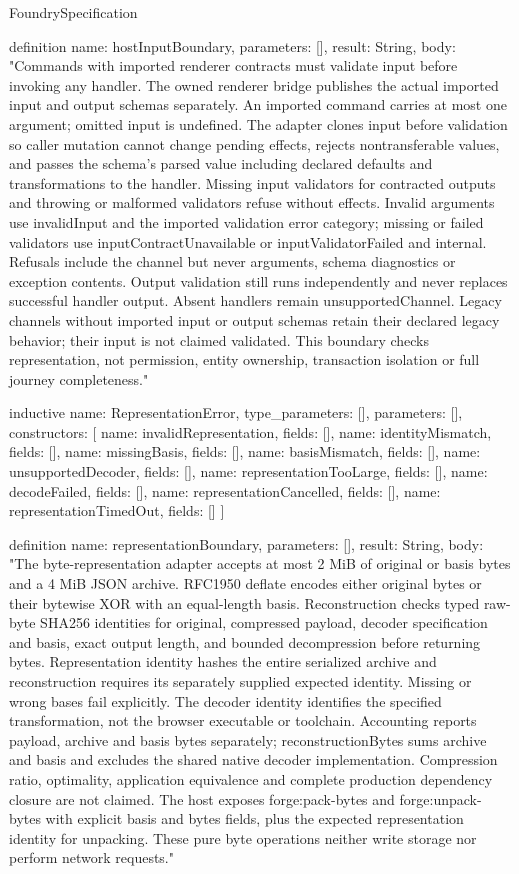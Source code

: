 \begin{lexlean}{FoundrySpecification}
\begin{semanticmodule}
definition{
  name: hostInputBoundary,
  parameters: [],
  result: String,
  body: "Commands with imported renderer contracts must validate input before invoking any handler. The owned renderer bridge publishes the actual imported input and output schemas separately. An imported command carries at most one argument; omitted input is undefined. The adapter clones input before validation so caller mutation cannot change pending effects, rejects nontransferable values, and passes the schema's parsed value including declared defaults and transformations to the handler. Missing input validators for contracted outputs and throwing or malformed validators refuse without effects. Invalid arguments use invalidInput and the imported validation error category; missing or failed validators use inputContractUnavailable or inputValidatorFailed and internal. Refusals include the channel but never arguments, schema diagnostics or exception contents. Output validation still runs independently and never replaces successful handler output. Absent handlers remain unsupportedChannel. Legacy channels without imported input or output schemas retain their declared legacy behavior; their input is not claimed validated. This boundary checks representation, not permission, entity ownership, transaction isolation or full journey completeness."
}

inductive{
  name: RepresentationError,
  type_parameters: [],
  parameters: [],
  constructors: [
    {name: invalidRepresentation, fields: []},
    {name: identityMismatch, fields: []},
    {name: missingBasis, fields: []},
    {name: basisMismatch, fields: []},
    {name: unsupportedDecoder, fields: []},
    {name: representationTooLarge, fields: []},
    {name: decodeFailed, fields: []},
    {name: representationCancelled, fields: []},
    {name: representationTimedOut, fields: []}
  ]
}

definition{
  name: representationBoundary,
  parameters: [],
  result: String,
  body: "The byte-representation adapter accepts at most 2 MiB of original or basis bytes and a 4 MiB JSON archive. RFC1950 deflate encodes either original bytes or their bytewise XOR with an equal-length basis. Reconstruction checks typed raw-byte SHA256 identities for original, compressed payload, decoder specification and basis, exact output length, and bounded decompression before returning bytes. Representation identity hashes the entire serialized archive and reconstruction requires its separately supplied expected identity. Missing or wrong bases fail explicitly. The decoder identity identifies the specified transformation, not the browser executable or toolchain. Accounting reports payload, archive and basis bytes separately; reconstructionBytes sums archive and basis and excludes the shared native decoder implementation. Compression ratio, optimality, application equivalence and complete production dependency closure are not claimed. The host exposes forge:pack-bytes and forge:unpack-bytes with explicit basis and bytes fields, plus the expected representation identity for unpacking. These pure byte operations neither write storage nor perform network requests."
}


\end{semanticmodule}
\end{lexlean}
